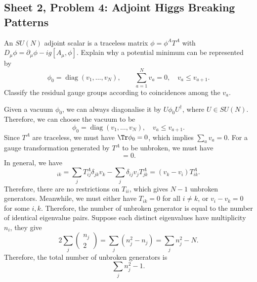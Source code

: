 \subsection{Sheet 2, Problem 4: Adjoint Higgs Breaking Patterns}

An $SU(N)$ adjoint scalar is a traceless matrix
$\phi=\phi^AT^A$ with
$D_\mu\phi=\partial_\mu\phi-ig[A_\mu,\phi]$.
Explain why a potential minimum can be represented by
\begin{equation}
    \phi_0=\operatorname{diag}(v_1,\ldots,v_N),
    \qquad \sum_{a=1}^Nv_a=0,\quad v_a\leq v_{a+1}.
\end{equation}
Classify the residual gauge groups according to coincidences among
the $v_a$.
\begin{solution}
    Given a vacuum $\phi_0$, we can always diagonalise it by $U\phi_0 U^\dagger$, where $U \in SU(N)$. Therefore, we can choose the vacuum to be
    \begin{equation}
        \phi_0  = \operatorname{diag}(v_1,\ldots,v_N),\quad v_a\leq v_{a+1}.
    \end{equation}
    Since $T^A$ are traceless, we must have $\Tr \phi_0 = 0$, which implies $\sum_a v_a = 0$. For a gauge transformation generated by $T^A$ to be unbroken, we must have
    \begin{equation}
        [T^A, \phi_0] = 0.
    \end{equation}
    In general, we have
    \begin{equation}
        [T^A,\phi_0]_{ik} = \sum_j T^A_{ij}\delta_{jk}v_k - \sum_j \delta_{ij}v_j T^A_{jk} = (v_k -v_i) T^A_{ik}.
    \end{equation}
    Therefore, there are no restrictions on $T_{ii}$, which gives $N-1$ unbroken generators. Meanwhile, we must either have $T_{ik} = 0$ for all $i\neq k$, or $v_i - v_k = 0$ for some $i,k$. Therefore, the number of unbroken generator is equal to the number of identical eigenvalue pairs. Suppose each distinct eigenvalues have multiplicity $n_i$, they give
    \begin{equation}
        2\sum_{j}\begin{pmatrix}
            n_j \\ 2
        \end{pmatrix} = \sum_j(n_j^2 -n_j) = \sum_jn_j^2 - N.
    \end{equation}
    Therefore, the total number of unbroken generators is
    \begin{equation}
        \sum_jn_j^2 - 1.
    \end{equation}
\end{solution}

